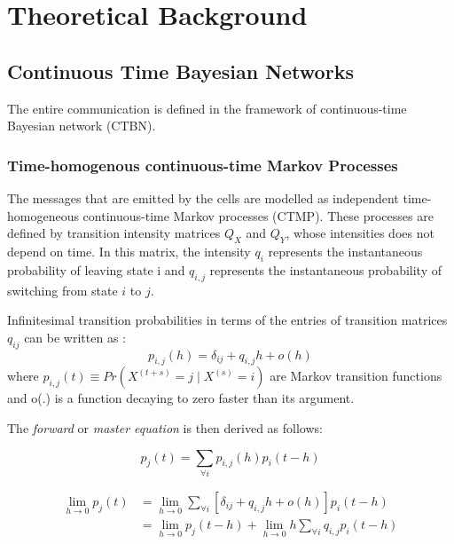 \chapter{Theoretical Background}
\blindtext

\section{Continuous Time Bayesian Networks}
The entire communication is defined in the framework of continuous-time Bayesian network (CTBN).
\subsection{Time-homogenous continuous-time Markov Processes}
The messages that are emitted by the cells are modelled as independent time-homogeneous continuous-time Markov processes (CTMP). These processes are defined by transition intensity matrices $ Q_{X} $ and $ Q_{Y} $, whose intensities does not depend on time. In this matrix, the intensity $ q_{i} $ represents the instantaneous probability of leaving state i and $ q_{i,j} $ represents the instantaneous probability of switching from state $ i $ to $ j $. %

Infinitesimal transition probabilities in terms of the entries of transition matrices $ q_{ij} $ can be written as \cite{Cohn2010a}:
\begin{equation}
p_{i,j}(h)=\delta_{ij}+q_{i,j} h+o(h)
\end{equation}
where $ p_{i, j}(t) \equiv Pr(X^{(t+s)}=j\mid X^{(s)}=i) $ are Markov transition functions and o(.) is a function decaying to zero faster than its argument.

The \textit{forward} or \textit{master equation} is then derived as follows:

\begin{equation}
p_{j}(t)=\sum_{\forall i} p_{i, j}(h) p_{i}(t-h)
\end{equation}

\begin{equation}
\begin{split}
\lim_{h\rightarrow 0} p_{j}(t) & = \lim_{h\rightarrow 0} \sum_{\forall i} \left[ \delta_{ij}+q_{i,j} h+o(h)\right]  p_{i}(t-h) \\ & = \lim_{h\rightarrow 0} p_{j}(t-h) + \lim_{h\rightarrow 0} h \sum_{\forall i} q_{i,j} p_{i}(t-h)
\end{split}
\end{equation}

